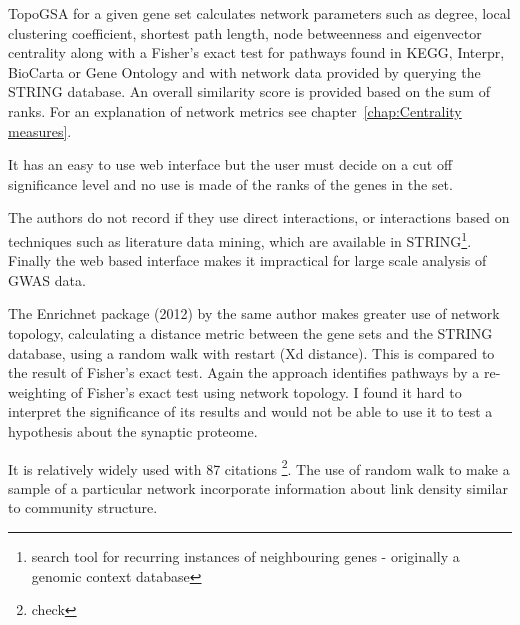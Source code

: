  TopoGSA \cite{glaab2010topogsa} for a given gene set calculates network parameters such as degree, local clustering coefficient, shortest path length, node betweenness and eigenvector centrality along with a Fisher's exact test for pathways found in KEGG, Interpr, BioCarta or Gene Ontology and with network data provided by querying the STRING database\cite{szklarczyk2019string}. An overall similarity score is provided based on the sum of ranks. For an explanation of network metrics see chapter~\ref{chap:Centrality measures}.

It has an easy to use web interface but the user must decide on a cut off significance level and no use is made of the ranks of the genes in the set. 

The authors do not record if they use direct interactions, or interactions based on techniques such as literature data mining, which are available in STRING\footnote{search tool for recurring instances of neighbouring genes - originally a genomic context database}\cite{szklarczyk2019string}. Finally the web based interface makes it impractical for large scale analysis of GWAS data. 

The Enrichnet package (2012) by the same author \cite{glaab2012enrichnet} makes greater use of network topology, calculating a distance metric between the gene sets and the STRING database, using a random walk with restart (Xd distance). This is compared to the result of Fisher's exact test. Again the approach identifies pathways by a re-weighting of Fisher's exact test using network topology. I found it hard to interpret the significance of its results and would not be able to use it to test a hypothesis about the synaptic proteome.

It is relatively widely used with 87 citations \footnote{check}. The use of random walk to make a sample of a particular network incorporate information about link density similar to community structure. 

